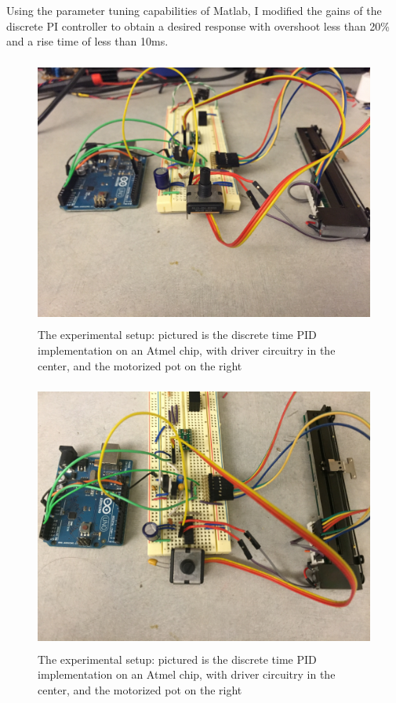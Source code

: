 \documentclass[Nomencl]{SelimArticle}
\begin{document}
Using the parameter tuning capabilities of Matlab, I modified the gains of the discrete PI controller to obtain a desired response with overshoot less than 20\%
and a rise time of less than 10ms.

\begin{figure}[!ht]
    \centering
    \includegraphics[width=\textwidth, height=3.5in]{exp1}
    \caption{The experimental setup: pictured is the discrete time PID implementation on an Atmel chip, with driver circuitry in the center, and the motorized pot on the right}
    \label{fig:exp1}
    
\end{figure}

\begin{figure}[!ht]
    \centering
    \includegraphics[width=\textwidth, height=3.5in]{exp2}
    \caption{The experimental setup: pictured is the discrete time PID implementation on an Atmel chip, with driver circuitry in the center, and the motorized pot on the right}
    \label{fig:exp2}
\end{figure}
\end{document}

